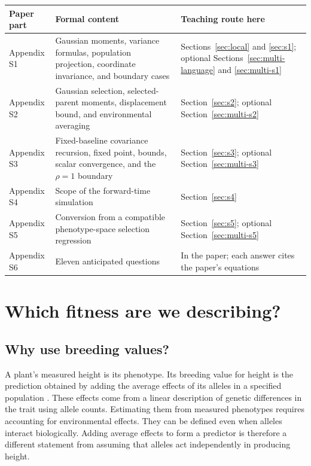 \documentclass[11pt]{article}
\newcounter{answer}
\begin{document}
\begin{center}
\begin{tabularx}{\textwidth}{@{}p{}X X@{}}
\toprule
Paper part & Formal content & Teaching route here \\
\midrule
Appendix S1 & Gaussian moments, variance formulas, population projection,
coordinate invariance, and boundary cases & Sections~\ref{sec:local} and
\ref{sec:s1}; optional Sections~\ref{sec:multi-language} and
\ref{sec:multi-s1} \\
Appendix S2 & Gaussian selection, selected-parent moments, displacement bound,
and environmental averaging & Section~\ref{sec:s2}; optional
Section~\ref{sec:multi-s2} \\
Appendix S3 & Fixed-baseline covariance recursion, fixed point, bounds, scalar
convergence, and the $\rho=1$ boundary & Section~\ref{sec:s3}; optional
Section~\ref{sec:multi-s3} \\
Appendix S4 & Scope of the forward-time simulation & Section~\ref{sec:s4} \\
Appendix S5 & Conversion from a compatible phenotype-space selection
regression & Section~\ref{sec:s5}; optional Section~\ref{sec:multi-s5} \\
Appendix S6 & Eleven anticipated questions & In the paper; each answer cites the paper's equations \\
\bottomrule
\end{tabularx}
\end{center}

\section{Which fitness are we describing?}
\label{sec:target}

\subsection{Why use breeding values?}

A plant's measured height is its phenotype. Its breeding value for height is the prediction obtained by adding the average effects of its alleles in a specified population \citep{Fisher1918,Fisher1941}. These effects come from a linear description of genetic differences in the trait using allele counts. Estimating them from measured phenotypes requires accounting for environmental effects. They can be defined even when alleles interact biologically. Adding average effects to form a predictor is therefore a different statement from assuming that alleles act independently in producing height.
\end{document}
